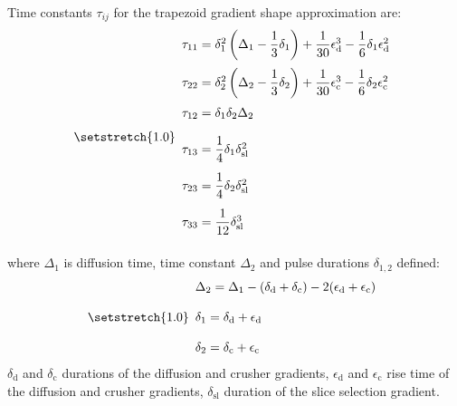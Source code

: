 Time constants $\tau_{ij}$ for the trapezoid gradient shape approximation are:
\begin{equation}\label{eq: bmatrix timing}
{\setstretch{1.0}
\begin{array}{l}
	
	\tau_{11} = \delta_1^2\left( \Delta_1 - \dfrac{1}{3}\delta_1\right) + \dfrac{1}{30}\epsilon_{\mathrm{d}}^3-\dfrac{1}{6}\delta_1\epsilon_{{\mathrm{d}}}^2\\[12pt]
	\tau_{22} = \delta_2^2\left( \Delta_2 - \dfrac{1}{3}\delta_2\right) + \dfrac{1}{30}\epsilon_{\mathrm{c}}^3-\dfrac{1}{6}\delta_2\epsilon_{{\mathrm{c}}}^2\\[12pt]
	\tau_{12} = \delta_1\delta_2\Delta_2\\[12pt]
	\tau_{13} = \dfrac{1}{4}\delta_1\delta_{\mathrm{sl}}^2\\[12pt]
	\tau_{23} = \dfrac{1}{4}\delta_2\delta_{\mathrm{sl}}^2\\[12pt]
	\tau_{33} = \dfrac{1}{12}\delta_{\mathrm{sl}}^3\\[12pt]
\end{array}
}
\end{equation}
where $\Delta_1$ is diffusion time, time constant $\Delta_2$ and pulse durations $\delta_{1,2}$ defined:
\begin{equation}\label{eq: bmatrix timing delta}
{\setstretch{1.0}
\begin{array}{l}
	\Delta_{2} = \Delta_{1}-(\delta_{\mathrm{d}}+\delta_{\mathrm{c}})-2(\epsilon_{\mathrm{d}}+\epsilon_{\mathrm{c}})\\[12pt]
	\delta_{1} = \delta_{\mathrm{d}}+\epsilon_{\mathrm{d}}\\[12pt]
	\delta_{2} = \delta_{\mathrm{c}}+\epsilon_{\mathrm{c}}
\end{array}
}
\end{equation}
$\delta_{\mathrm{d}}$ and $\delta_{\mathrm{c}}$ durations of the diffusion and crusher gradients, $\epsilon_{\mathrm{d}}$ and $\epsilon_{\mathrm{c}}$ rise time of the diffusion and crusher gradients, $\delta_{\mathrm{sl}}$ duration of the slice selection gradient.
	
	